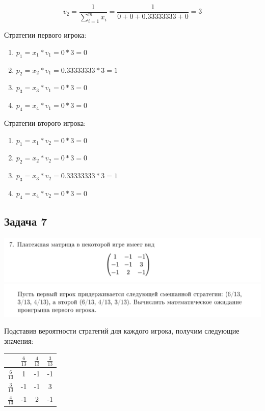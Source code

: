 \documentclass[9pt, a4paper]{article}
\begin{document}
    \begin{equation}
        v_2 = \frac{1}{\sum_{i=1}^m x_i} = \frac{1}{0 + 0 + 0.33333333 + 0} = 3\label{eq:equation39}
    \end{equation}

    Стратегии первого игрока:
    \begin{enumerate}
        \item $p_1 = x_1 * v_1 = 0 * 3 = 0$
        \item $p_2 = x_2 * v_1 = 0.33333333 * 3 = 1$
        \item $p_3 = x_3 * v_1 = 0 * 3 = 0$
        \item $p_4 = x_4 * v_1 = 0 * 3 = 0$
    \end{enumerate}

    Стратегии второго игрока:
    \begin{enumerate}
        \item $p_1 = x_1 * v_2 = 0 * 3 = 0$
        \item $p_2 = x_2 * v_2 = 0 * 3 = 0$
        \item $p_3 = x_3 * v_2 = 0.33333333 * 3 = 1$
        \item $p_4 = x_4 * v_2 = 0 * 3 = 0$
    \end{enumerate}

    \newpage

    \subsection{Задача 7}\label{subsec:task7}
    \includegraphics[width=1\textwidth]{docs/7_1}
    \includegraphics[width=1\textwidth]{docs/7_2}

    Подставив вероятности стратегий для каждого игрока, получим следующие значения:

    \begin{table}[h]
        \begin{tabular}{|c|c|c|c|}
            \hline
            & $\frac{6}{13}$ & $\frac{4}{13}$ & $\frac{3}{13}$ \\
            \hline
            $\frac{6}{13}$ & 1              & -1             & -1             \\
            \hline
            $\frac{3}{13}$ & -1             & -1             & 3              \\
            \hline
            $\frac{4}{13}$ & -1             & 2              & -1             \\
            \hline
        \end{tabular}\label{tab:table2}
    \end{table}
\end{document}
